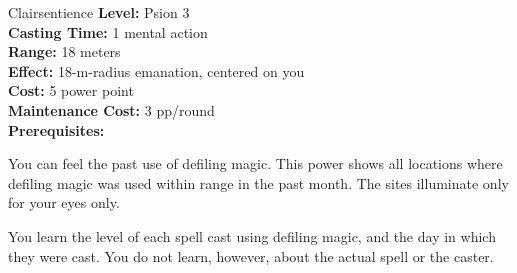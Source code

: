 {Clairsentience}
{
	\textbf{Level:}
	Psion 3\\
	\textbf{Casting Time:}
	1 mental action\\
	\textbf{Range:}
	18 meters\\
	\textbf{Effect:}
	18-m-radius emanation, centered on you\\
	\textbf{Cost:}
	5 power point\\
	\textbf{Maintenance Cost:}
	3 pp/round\\
	\textbf{Prerequisites:}
	\\
}
{
	You can feel the past use of defiling magic. This power shows all locations where defiling magic was used within range in the past month. The sites illuminate only for your eyes only.

	You learn the level of each spell cast using defiling magic, and the day in which they were cast. You do not learn, however, about the actual spell or the caster.
}
